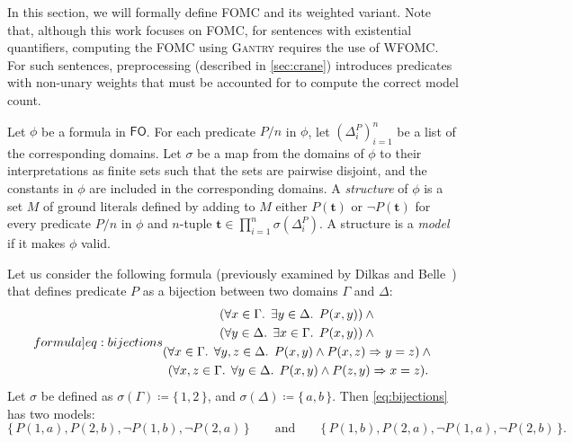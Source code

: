 \documentclass[a4paper,UKenglish,cleveref, autoref, thm-restate]{lipics-v2021}
\newcommand{\FO}{$\mathsf{FO}$}
\newcommand{\Cranetwo}{\textsc{Gantry}}
\begin{document}
In this section, we will formally define FOMC and its weighted variant. Note
that, although this work focuses on FOMC, for sentences with existential
quantifiers, computing the FOMC using \Cranetwo{} requires the use of WFOMC\@.
For such sentences, preprocessing (described in \cref{sec:crane}) introduces
predicates with non-unary weights that must be accounted for to compute the
correct model count.


\begin{definition}\label{def:model}
  Let $\phi$ be a formula in \FO{}. For each predicate $P/n$ in $\phi$, let
  ${(\Delta_{i}^{P})}_{i=1}^{n}$ be a list of the corresponding domains. Let
  $\sigma$ be a map from the domains of $\phi$ to their interpretations as
  finite sets such that the sets are pairwise disjoint, and the constants in
  $\phi$ are included in the corresponding domains. A \emph{structure} of $\phi$
  is a set $M$ of ground literals defined by adding to $M$ either
  $P(\mathbf{t})$ or $\neg P(\mathbf{t})$ for every predicate $P/n$ in $\phi$
  and $n$-tuple $\mathbf{t} \in \prod_{i=1}^{n} \sigma(\Delta_{i}^{P})$. A
  structure is a \emph{model} if it makes $\phi$ valid.
\end{definition}

\begin{example}\label{example:overall}
  Let us consider the following formula (previously examined by Dilkas and
  Belle~\cite{DBLP:conf/kr/DilkasB23}) that defines predicate $P$ as a bijection
  between two domains $\Gamma$ and $\Delta$:
  \begin{equation}\label[formula]{eq:bijections}
    \begin{gathered}
      (\forall x \in \Gamma\text{. }\exists y \in \Delta\text{. }P(x, y))\land{}\\
      (\forall y \in \Delta\text{. }\exists x \in \Gamma\text{. }P(x, y))\land{}\\
      (\forall x \in \Gamma\text{. }\forall y, z \in \Delta\text{. }P(x, y) \land P(x, z) \Rightarrow y = z)\land{}\\
      (\forall x, z \in \Gamma\text{. }\forall y \in \Delta\text{. }P(x, y) \land P(z, y) \Rightarrow x = z).
    \end{gathered}
  \end{equation}
  Let $\sigma$ be defined as $\sigma(\Gamma) \coloneqq \{\, 1, 2\,\}$, and
  $\sigma(\Delta) \coloneqq \{\,a, b\,\}$. Then \cref{eq:bijections} has two
  models:
  \[
    \{\, P(1, a), P(2, b), \neg P(1, b), \neg P(2, a) \,\} \qquad \text{and} \qquad \{\, P(1, b), P(2, a), \neg P(1, a), \neg P(2, b) \,\}.
  \]
\end{example}
\end{document}
